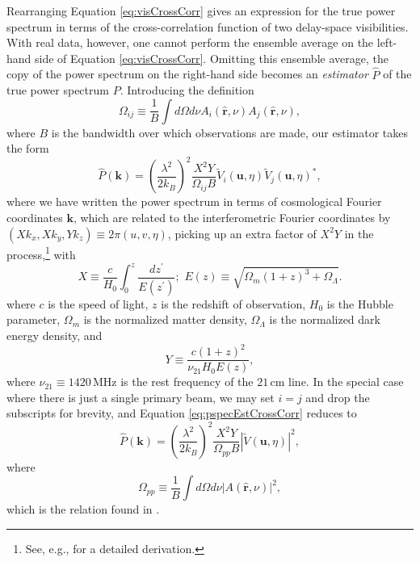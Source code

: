 \documentclass[twocolumn,apj,numberedappendix]{emulateapj}
\newcommand{\rhat}{\hat{\mathbf{r}}}
\begin{document}
Rearranging Equation \eqref{eq:visCrossCorr} gives an expression for the true power spectrum in terms of the cross-correlation function of two delay-space visibilities. With real data, however, one cannot perform the ensemble average on the left-hand side of Equation \eqref{eq:visCrossCorr}. Omitting this ensemble average, the copy of the power spectrum on the right-hand side becomes an \emph{estimator} $\widehat{P}$ of the true power spectrum $P$. Introducing the definition
\begin{equation}
\label{eq:Omega_ij_def}
\Omega_{ij} \equiv \frac{1}{B} \int d\Omega d\nu A_i (\rhat,\nu) A_j (\rhat,\nu),
\end{equation}
where $B$ is the bandwidth over which observations are made, our estimator takes the form
\begin{equation}
\label{eq:pspecEstCrossCorr}
\widehat{P} (\mathbf{k}) = \left( \frac{\lambda^2}{2 k_B} \right)^2 \frac{X^2 Y}{\Omega_{ij} B} \widetilde{V}_i(\mathbf{u},\eta) \widetilde{V}_j(\mathbf{u},\eta)^*,
\end{equation}
where we have written the power spectrum in terms of cosmological Fourier coordinates $\mathbf{k}$, which are related to the interferometric Fourier coordinates by $(X k_x, X k_y, Y k_z) \equiv 2 \pi (u , v, \eta)$, picking up an extra factor of $X^2 Y$ in the process,\footnote{See, e.g., \citep{liu_et_al2014a} for a detailed derivation.} with
\begin{equation}
X \equiv \frac{c}{H_0} \int_0^z \frac{dz^\prime}{E(z^\prime)}; \,\, E(z) \equiv \sqrt{\Omega_m (1+z)^3 + \Omega_\Lambda}.
\end{equation}
where $c$ is the speed of light, $z$ is the redshift of observation, $H_0$ is the Hubble parameter, $\Omega_m$ is the normalized matter density, $\Omega_\Lambda$ is the normalized dark energy density, and
\begin{equation}
Y \equiv  \frac{c(1+z)^2}{\nu_{21} H_0 E(z)},
\end{equation}
where $\nu_{21} \equiv 1420\,\textrm{MHz}$ is the rest frequency of the $21\,\textrm{cm}$ line. In the special case where there is just a single primary beam, we may set $i=j$ and drop the subscripts for brevity, and Equation \eqref{eq:pspecEstCrossCorr} reduces to
\begin{equation}
\label{eq:P14est}
\widehat{P} (\mathbf{k}) = \left( \frac{\lambda^2}{2 k_B} \right)^2 \frac{X^2 Y}{\Omega_{pp} B} | \widetilde{V}(\mathbf{u},\eta) |^2,
\end{equation}
where
\begin{equation}
\Omega_{pp} \equiv \frac{1}{B} \int d\Omega d\nu |A (\rhat,\nu)|^2,
\end{equation}
which is the relation found in \citet{P14}.
\end{document}
